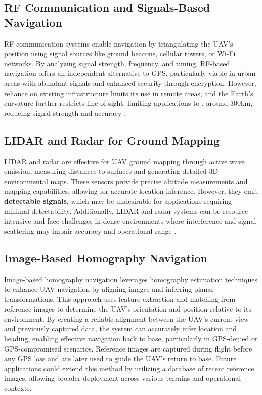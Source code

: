 \subsection{RF Communication and Signals-Based Navigation}

RF communication systems enable navigation by triangulating the UAV’s position using signal sources like ground beacons, cellular towers, or Wi-Fi networks. By analyzing signal strength, frequency, and timing, RF-based navigation offers an independent alternative to GPS, particularly viable in urban areas with abundant signals and enhanced security through encryption. However, reliance on existing infrastructure limits its use in remote areas, and the Earth's curvature further restricts line-of-sight, limiting applications to , around 300km, reducing signal strength and accuracy \cite{brewer_line_2024}.

\subsection{LIDAR and Radar for Ground Mapping}

LIDAR and radar are effective for UAV ground mapping through active wave emission, measuring distances to surfaces and generating detailed 3D environmental maps. These sensors provide precise altitude measurements and mapping capabilities, allowing for accurate location inference. However, they emit \textbf{detectable signals}, which may be undesirable for applications requiring minimal detectability. Additionally, LIDAR and radar systems can be resource-intensive and face challenges in dense environments where interference and signal scattering may impair accuracy and operational range \cite{scoutaerial2024lidar}.


\subsection{Image-Based Homography Navigation}


Image-based homography navigation leverages homography estimation techniques to enhance UAV navigation by aligning images and inferring planar transformations. This approach uses feature extraction and matching from reference images to determine the UAV’s orientation and position relative to its environment. By creating a reliable alignment between the UAV’s current view and previously captured data, the system can accurately infer location and heading, enabling effective navigation back to base, particularly in GPS-denied or GPS-compromised scenarios. Reference images are captured during flight before any GPS loss and are later used to guide the UAV’s return to base. Future applications could extend this method by utilizing a database of recent reference images, allowing broader deployment across various terrains and operational contexts.

